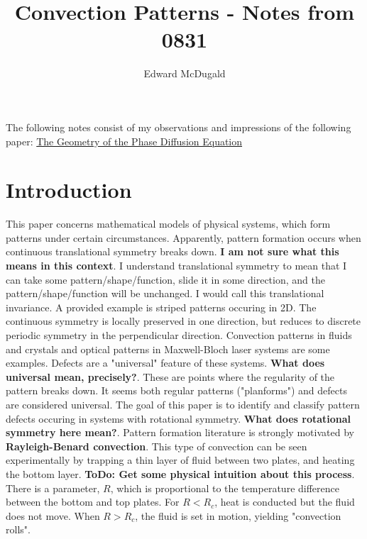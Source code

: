 \documentclass[12pt]{article}
\title{Convection Patterns - Notes from 0831}
\author{Edward McDugald}
\begin{document}
\maketitle

The following notes consist of my observations and impressions of the following paper:\newline
\href{https://www.math.arizona.edu/~anewell/publications/Geometry_Phase_Diffusion_Eq.pdf}{The Geometry of the Phase Diffusion Equation}

\section{Introduction}
\hspace*{10mm} This paper concerns mathematical models of physical systems, which form patterns under certain circumstances.
Apparently, pattern formation occurs when continuous translational symmetry breaks down. \textbf{I am not sure what this means in this context}. I understand translational symmetry to mean that I can take some pattern/shape/function, slide it in some direction, and the pattern/shape/function will be unchanged. I would call this translational invariance.
A provided example is striped patterns occuring in 2D. The continuous symmetry is locally preserved in one direction, but reduces to discrete periodic symmetry in the perpendicular direction. Convection patterns in fluids and crystals and optical patterns in Maxwell-Bloch laser systems are some examples.\newline
\hspace*{10mm} Defects are a "universal" feature of these systems. \textbf{What does universal mean, precisely?}. These are points where the regularity of the pattern breaks down. It seems both regular patterns ("planforms") and defects are considered universal. The goal of this paper is to identify and classify pattern defects occuring in systems with rotational symmetry.
\textbf{What does rotational symmetry here mean?}. \newline
\hspace*{10mm} Pattern formation literature is strongly motivated by \textbf{Rayleigh-Benard convection}. This type of convection can be seen experimentally by trapping a thin layer of fluid between two plates, and heating the bottom layer. \textbf{ToDo: Get some physical intuition about this process}. There is a parameter, $R$, which is proportional to the temperature difference between the bottom and top plates. For $R<R_c$, heat is conducted but the fluid does not move. When $R>R_c$, the fluid is set in motion, yielding "convection rolls".\newline
\end{document}
